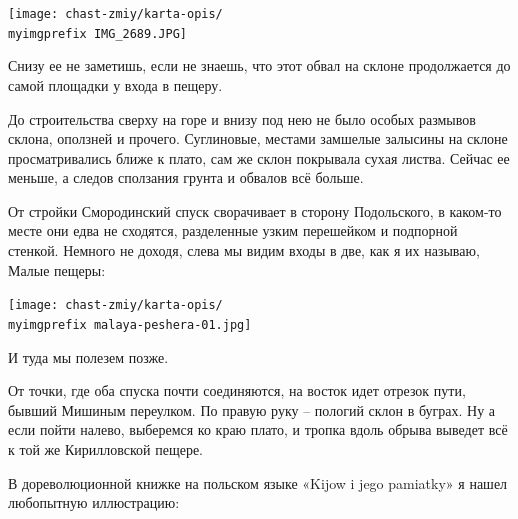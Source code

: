 \begin{center}
\texttt{[image: chast-zmiy/karta-opis/\\myimgprefix IMG\_2689.JPG]}
\end{center}

Снизу ее не заметишь, если не знаешь, что этот обвал на склоне продолжается до самой площадки у входа в пещеру.

До строительства сверху на горе и внизу под нею не было особых размывов склона, оползней и прочего. Суглиновые, местами замшелые залысины на склоне просматривались ближе к плато, сам же склон покрывала сухая листва. Сейчас ее меньше, а следов сползания грунта и обвалов всё больше.

От стройки Смородинский спуск сворачивает в сторону Подольского, в каком-то месте они едва не сходятся, разделенные узким перешейком и подпорной стенкой. Немного не доходя, слева мы видим входы в две, как я их называю, Малые пещеры:

\begin{center}
\texttt{[image: chast-zmiy/karta-opis/\\myimgprefix malaya-peshera-01.jpg]}
\end{center}

И туда мы полезем позже.

От точки, где оба спуска почти соединяются, на восток идет отрезок пути, бывший Мишиным переулком. По правую руку – пологий склон в буграх. Ну а если пойти налево, выберемся ко краю плато, и тропка вдоль обрыва выведет всё к той же Кирилловской пещере.

В дореволюционной книжке на польском языке «Kijow i jego pamiatky» я нашел любопытную иллюстрацию: 

